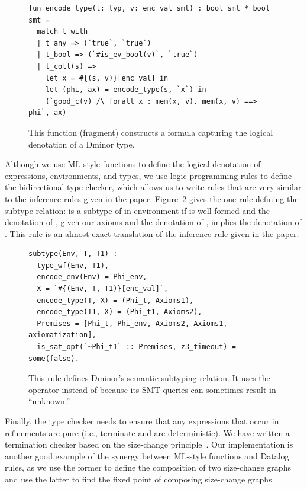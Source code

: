 \documentclass[acmsmall,screen,nonacm]{acmart}
\theoremstyle{definition}
\begin{document}
\begin{figure}[!t]
    \begin{lstlisting}
fun encode_type(t: typ, v: enc_val smt) : bool smt * bool smt =
  match t with
  | t_any => (`true`, `true`)
  | t_bool => (`#is_ev_bool(v)`, `true`)
  | t_coll(s) =>
    let x = #{(s, v)}[enc_val] in
    let (phi, ax) = encode_type(s, `x`) in
    (`good_c(v) /\ forall x : mem(x, v). mem(x, v) ==> phi`, ax)
    \end{lstlisting}
    \caption{This function (fragment) constructs a formula capturing the
    logical denotation of a Dminor type.}
    \label{fig:encode_type}
\end{figure}

Although we use ML-style functions to define the logical denotation of
expressions, environments, and types, we use logic programming rules to define
the bidirectional type checker, which allows us to write rules that are very
similar to the inference rules given in the paper.
Figure~\ref{fig:subtype} gives the one rule defining the subtype relation:
 is a subtype of  in environment  if  is
well formed and the denotation of , given our axioms and the denotation
of , implies the denotation of .
This rule is an almost exact translation of the inference rule given in the
paper.

\begin{figure}[!t]
    \begin{lstlisting}
subtype(Env, T, T1) :-
  type_wf(Env, T1),
  encode_env(Env) = Phi_env,
  X = `#{(Env, T, T1)}[enc_val]`,
  encode_type(T, X) = (Phi_t, Axioms1),
  encode_type(T1, X) = (Phi_t1, Axioms2),
  Premises = [Phi_t, Phi_env, Axioms2, Axioms1, axiomatization],
  is_sat_opt(`~Phi_t1` :: Premises, z3_timeout) = some(false).
    \end{lstlisting}
    \caption{This rule defines Dminor's semantic subtyping relation. It uses
    the operator  instead of  because its SMT
    queries can sometimes result in ``unknown.''}
    \label{fig:subtype}
\end{figure}

Finally, the type checker needs to ensure that any expressions that occur
in refinements are pure (i.e., terminate and are deterministic).
We have written a termination checker based on the size-change
principle~\cite{sizechange}.
Our implementation is another good example of the synergy between ML-style
functions and Datalog rules, as we use the former to define the
composition of two size-change graphs and use the latter to find the fixed
point of composing size-change graphs.
\end{document}
